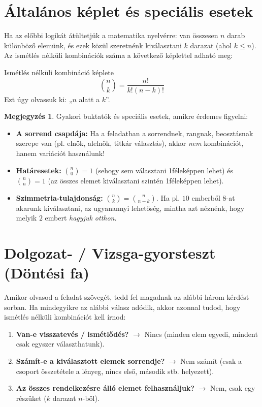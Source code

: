 \documentclass[a4paper,12pt]{article}
\newcommand{\textbfr}[1]{\textbf{\textcolor{bvred}{#1}}} %
\theoremstyle{definition} %
\newtheorem*{remark}{\mytriangle{bvred} Megjegyzés}
\begin{document}
\section{Általános képlet és speciális esetek}
Ha az előbbi logikát átültetjük a matematika nyelvérre: van összesen $n$ darab különböző elemünk, és ezek közül szeretnénk kiválasztani $k$ darazat (ahol $k \le n$). Az ismétlés nélküli kombinációk száma a következő képlettel adható meg:

\begin{tetel}{Ismétlés nélküli kombináció képlete}
$$\binom{n}{k} = \frac{n!}{k!(n-k)!}$$
Ezt úgy olvassuk ki: „$n$ alatt a $k$”.
\end{tetel}

\begin{remark}
Gyakori buktatók és speciális esetek, amikre érdemes figyelni:
\begin{itemize}
    \item \textbf{A sorrend csapdája:} Ha a feladatban a sorrendnek, rangnak, beosztásnak szerepe van (pl. elnök, alelnök, titkár választás), akkor \textit{nem} kombinációt, hanem variációt használunk!
    \item \textbf{Határesetek:} $\binom{n}{0} = 1$ (sehogy sem választani 1féleképpen lehet) és $\binom{n}{n} = 1$ (az összes elemet kiválasztani szintén 1féleképpen lehet).
    \item \textbf{Szimmetria-tulajdonság:} $\binom{n}{k} = \binom{n}{n-k}$. Ha pl. $10$ emberből $8$-at akarunk kiválasztani, az ugyanannyi lehetőség, mintha azt néznénk, hogy melyik $2$ embert \textit{hagyjuk otthon}.
\end{itemize}
\end{remark}

\section{Dolgozat- / Vizsga-gyorsteszt (Döntési fa)}
Amikor olvasod a feladat szövegét, tedd fel magadnak az alábbi három kérdést sorban. Ha mindegyikre az alábbi válasz adódik, akkor azonnal tudod, hogy ismétlés nélküli kombinációt kell írnod:

\begin{enumerate}[label=\textbfr{\arabic*}.]
    \item \textbf{Van-e visszatevés / ismétlődés?} $\rightarrow$ Nincs (minden elem egyedi, mindent csak egyszer választhatunk).
    \item \textbf{Számít-e a kiválasztott elemek sorrendje?} $\rightarrow$ Nem számít (csak a csoport összetétele a lényeg, nincs első, második stb. helyezett).
    \item \textbf{Az összes rendelkezésre álló elemet felhasználjuk?} $\rightarrow$ Nem, csak egy részüket ($k$ darazat $n$-ből).
\end{enumerate}
\end{document}
